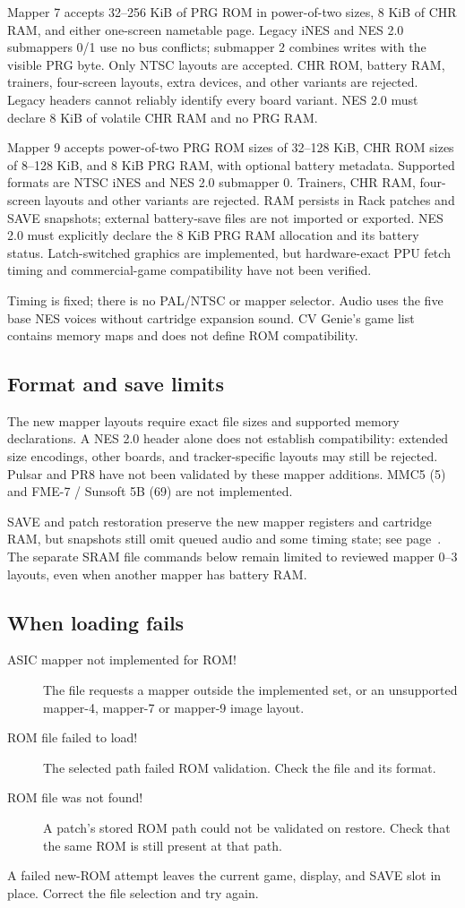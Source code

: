 Mapper 7 accepts 32--256 KiB of PRG ROM in power-of-two sizes, 8 KiB of
CHR RAM, and either one-screen nametable page. Legacy iNES and NES 2.0
submappers 0/1 use no bus conflicts; submapper 2 combines writes with the
visible PRG byte. Only NTSC layouts are accepted. CHR ROM, battery RAM,
trainers, four-screen layouts, extra devices, and other variants are rejected.
Legacy headers cannot reliably identify every board variant.
NES 2.0 must declare 8 KiB of volatile CHR RAM and no PRG RAM.

Mapper 9 accepts power-of-two PRG ROM sizes of 32--128 KiB, CHR ROM sizes
of 8--128 KiB, and 8 KiB PRG RAM, with optional battery metadata. Supported
formats are NTSC iNES and NES 2.0 submapper 0. Trainers, CHR RAM, four-screen
layouts and other variants are rejected. RAM persists in Rack patches and
SAVE snapshots; external battery-save files are not imported or exported.
NES 2.0 must explicitly declare the 8 KiB PRG RAM allocation and its battery
status. Latch-switched graphics are implemented, but hardware-exact PPU fetch
timing and commercial-game compatibility have not been verified.

Timing is fixed; there is no PAL/NTSC or mapper selector. Audio uses the five
base NES voices without cartridge expansion sound. CV Genie's game list
contains memory maps and does not define ROM compatibility.

\newpage
\subsection{Format and save limits}
The new mapper layouts require exact file sizes and supported memory
declarations. A NES 2.0 header alone does not establish compatibility:
extended size encodings, other boards, and tracker-specific layouts may still
be rejected. Pulsar and PR8 have not been validated by these mapper additions.
MMC5 (5) and FME-7 / Sunsoft 5B (69) are not implemented.

SAVE and patch restoration preserve the new mapper registers and cartridge
RAM, but snapshots still omit queued audio and some timing state; see
page~\pageref{sec:state}. The separate SRAM file commands below remain limited
to reviewed mapper 0--3 layouts, even when another mapper has battery RAM.

\subsection{When loading fails}
\begin{description}
\item[ASIC mapper not implemented for ROM!]
The file requests a mapper outside the implemented set, or an unsupported
mapper-4, mapper-7 or mapper-9 image layout.
\item[ROM file failed to load!]
The selected path failed ROM validation. Check the file and its format.
\item[ROM file was not found!]
A patch's stored ROM path could not be validated on restore. Check that the
same ROM is still present at that path.
\end{description}
A failed new-ROM attempt leaves the current game, display, and SAVE slot
in place. Correct the file selection and try again.

